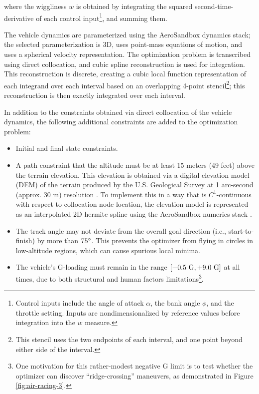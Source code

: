 \noindent where the wiggliness $w$ is obtained by integrating the squared second-time-derivative of each control input\footnote{Control inputs include the angle of attack $\alpha$, the bank angle $\phi$, and the throttle setting. Inputs are nondimensionalized by reference values before integration into the $w$ measure.}, and summing them.

The vehicle dynamics are parameterized using the AeroSandbox dynamics stack; the selected parameterization is 3D, uses point-mass equations of motion, and uses a spherical velocity representation. The optimization problem is transcribed using direct collocation, and cubic spline reconstruction is used for integration. This reconstruction is discrete, creating a cubic local function representation of each integrand over each interval based on an overlapping 4-point stencil\footnote{This stencil uses the two endpoints of each interval, and one point beyond either side of the interval.}; this reconstruction is then exactly integrated over each interval.

In addition to the constraints obtained via direct collocation of the vehicle dynamics, the following additional constraints are added to the optimization problem:
\begin{itemize}
    \item Initial and final state constraints.
    \item A path constraint that the altitude must be at least 15 meters (49 feet) above the terrain elevation. This elevation is obtained via a digital elevation model (DEM) of the terrain produced by the U.S. Geological Survey at 1 arc-second (approx. 30 m) resolution \cite{usgs_2022_dem}. To implement this in a way that is $C^1$-continuous with respect to collocation node location, the elevation model is represented as an interpolated 2D hermite spline using the AeroSandbox numerics stack \cite{sharpe_core_2022}.
    \item The track angle may not deviate from the overall goal direction (i.e., start-to-finish) by more than $75\degree$. This prevents the optimizer from flying in circles in low-altitude regions, which can cause spurious local minima.
    \item The vehicle's G-loading must remain in the range $[{-0.5\ \rm G}, {+9.0\ \rm G}]$ at all times, due to both structural and human factors limitations\footnote{One motivation for this rather-modest negative G limit is to test whether the optimizer can discover ``ridge-crossing'' maneuvers, as demonstrated in Figure \ref{fig:air-racing-3}.}.
\end{itemize}

